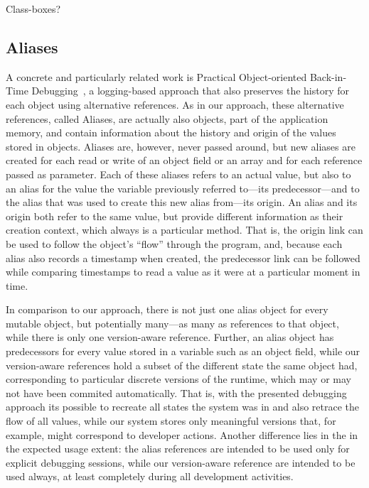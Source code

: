 Class-boxes? 


\subsection{Aliases}


A concrete and particularly related work is Practical Object-oriented Back-in-Time Debugging~\cite{Lienhard2008POB}, a logging-based approach that also preserves the history for each object using alternative references.
As in our approach, these alternative references, called Aliases, are actually also objects, part of the application memory, and contain information about the history and origin of the values stored in objects.
Aliases are, however, never passed around, but new aliases are created for each read or write of an object field or an array and for each reference passed as parameter.
Each of these aliases refers to an actual value, but also to an alias for the value the variable previously referred to---its predecessor---and to the alias that was used to create this new alias from---its origin.
An alias and its origin both refer to the same value, but provide different information as their creation context, which always is a particular method.
That is, the origin link can be used to follow the object's ``flow'' through the program, and, because each alias also records a timestamp when created, the predecessor link can be followed while comparing timestamps to read a value as it were at a particular moment in time.

In comparison to our approach, there is not just one alias object for every mutable object, but potentially many---as many as references to that object, while there is only one version-aware reference.
Further, an alias object has predecessors for every value stored in a variable such as an object field, while our version-aware references hold a subset of the different state the same object had, corresponding to particular discrete versions of the runtime, which may or may not have been commited automatically.
That is, with the presented debugging approach its possible to recreate all states the system was in and also retrace the flow of all values, while our system stores only meaningful versions that, for example, might correspond to developer actions.
Another difference lies in the in the expected usage extent: the alias references are intended to be used only for explicit debugging sessions, while our version-aware reference are intended to be used always, at least completely during all development activities.



